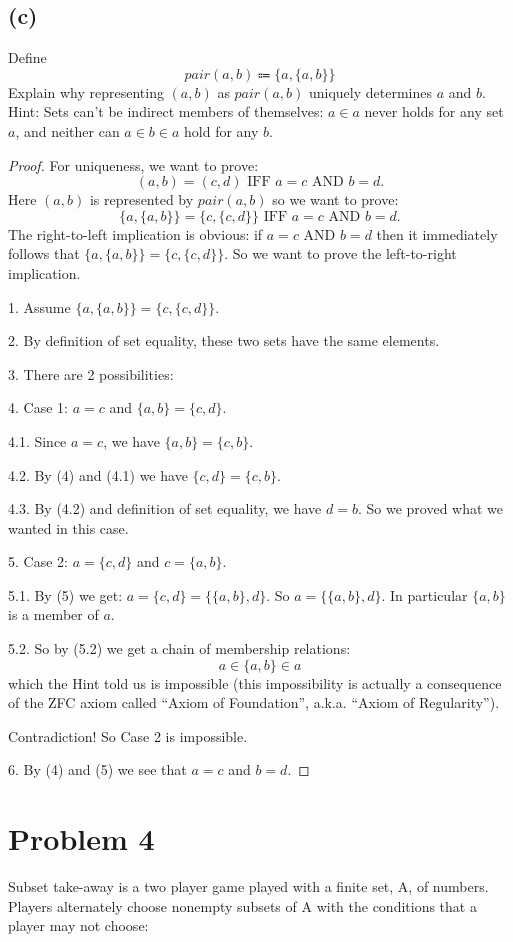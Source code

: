 \documentclass[14pt]{extarticle}
\begin{document}
\subsection{(c)}
Define 
$$
pair(a, b) \Coloneqq \{a, \{a, b\}\}
$$
Explain why representing $(a, b)$ as $pair(a, b)$ uniquely determines $a$ and $b$. Hint: Sets can’t be indirect members of themselves: $a \in a$ never holds for any set $a$, and neither can $a \in b \in a$ hold for any $b$.
\begin{proof}
For uniqueness, we want to prove:
$$
(a, b) = (c, d) \text{ IFF } a = c \text{ AND } b = d.
$$
Here $(a, b)$ is represented by $pair(a,b)$ so we want to prove:
$$
\{a, \{a, b\}\} = \{c, \{c, d\}\} \text{ IFF } a = c \text{ AND } b = d.
$$
The right-to-left implication is obvious: if $a = c \text{ AND } b = d$ then it immediately follows that $\{a, \{a, b\}\} = \{c, \{c, d\}\}$. So we want to prove the left-to-right implication.

1. Assume $\{a, \{a, b\}\} = \{c, \{c, d\}\}$.

2. By definition of set equality, these two sets have the same elements.

3. There are 2 possibilities:

4. Case 1: $a = c$ and $\{a, b\} = \{c, d\}$.

4.1. Since $a = c$, we have $\{a, b\} = \{c, b\}$.

4.2. By (4) and (4.1) we have $\{c, d\} = \{c, b\}$.

4.3. By (4.2) and definition of set equality, we have $d = b$. So we proved what we wanted in this case.

5. Case 2: $a = \{c, d\}$ and $c = \{a, b\}$.

5.1. By (5) we get: $a = \{c, d\} = \{\{a, b\}, d\}$. So $a = \{\{a, b\}, d\}$. In particular $\{a, b\}$ is a member of $a$.

5.2. So by (5.2) we get a chain of membership relations:
$$
a \in \{a, b\} \in a
$$
which the Hint told us is impossible (this impossibility is actually a consequence of the ZFC axiom called ``Axiom of Foundation'', a.k.a. ``Axiom of Regularity'').

Contradiction! So Case 2 is impossible.

6. By (4) and (5) we see that $a = c$ and $b = d$.
\end{proof}

\section{Problem 4}
Subset take-away is a two player game played with a finite set, A, of numbers. Players alternately choose nonempty subsets of A with the conditions that a player may not choose:
\end{document}
